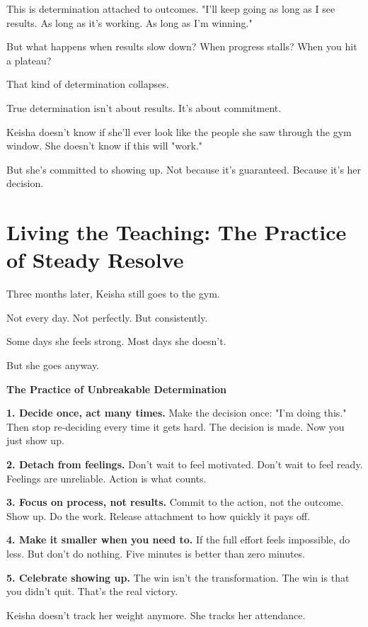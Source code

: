 \documentclass[11pt,twoside]{book}
\begin{document}
This is determination attached to outcomes. "I'll keep going as long as I see results. As long as it's working. As long as I'm winning."

But what happens when results slow down? When progress stalls? When you hit a plateau?

That kind of determination collapses.

True determination isn't about results. It's about commitment.

Keisha doesn't know if she'll ever look like the people she saw through the gym window. She doesn't know if this will "work."

But she's committed to showing up. Not because it's guaranteed. Because it's her decision.

\section*{Living the Teaching: The Practice of Steady Resolve}

Three months later, Keisha still goes to the gym.

Not every day. Not perfectly. But consistently.

Some days she feels strong. Most days she doesn't.

But she goes anyway.

\begin{practicebox}
\textbf{The Practice of Unbreakable Determination}

\textbf{1. Decide once, act many times.} Make the decision once: "I'm doing this." Then stop re-deciding every time it gets hard. The decision is made. Now you just show up.

\textbf{2. Detach from feelings.} Don't wait to feel motivated. Don't wait to feel ready. Feelings are unreliable. Action is what counts.

\textbf{3. Focus on process, not results.} Commit to the action, not the outcome. Show up. Do the work. Release attachment to how quickly it pays off.

\textbf{4. Make it smaller when you need to.} If the full effort feels impossible, do less. But don't do nothing. Five minutes is better than zero minutes.

\textbf{5. Celebrate showing up.} The win isn't the transformation. The win is that you didn't quit. That's the real victory.
\end{practicebox}

Keisha doesn't track her weight anymore. She tracks her attendance.
\end{document}
